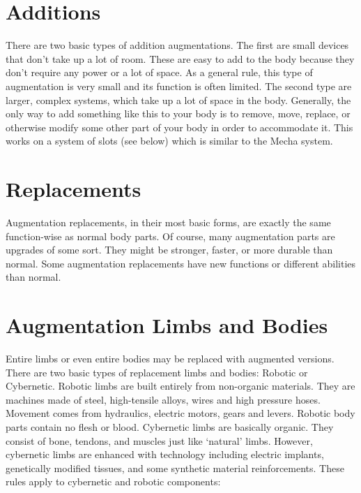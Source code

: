 \documentclass[twoside]{book}
\begin{document}
\section{Additions}
     There are two basic types of addition augmentations.
             The first are small devices that don't take up a lot
             of room. These are easy to add to the body because they
             don't require any power or a lot of space. As a
             general rule, this type of augmentation is very small and
             its function is often limited.  The second type are larger, complex systems, which
             take up a lot of space in the body. Generally, the only way
             to add something like this to your body is to remove, move,
             replace, or otherwise modify some other part of your body in
             order to accommodate it. This works on a system of slots
             (see below) which is similar to the Mecha system. 
\section{Replacements}
     Augmentation replacements, in their most basic forms,
             are exactly the same function-wise as normal body parts. Of
             course, many augmentation parts are upgrades of some sort.
             They might be stronger, faster, or more durable than normal.
             Some augmentation replacements have new functions or
             different abilities than normal. 
\section{Augmentation Limbs and Bodies}
     Entire limbs or even entire bodies may be replaced
             with augmented versions. There are two basic types of
             replacement limbs and bodies: Robotic or Cybernetic.  Robotic limbs are built entirely from non-organic
             materials. They are machines made of steel, high-tensile
             alloys, wires and high pressure hoses. Movement comes from
             hydraulics, electric motors, gears and levers. Robotic body
             parts contain no flesh or blood.  Cybernetic limbs are basically organic. They consist
             of bone, tendons, and muscles just like
             `natural' limbs. However, cybernetic limbs are
             enhanced with technology including electric implants,
             genetically modified tissues, and some synthetic material
             reinforcements.  These rules apply to cybernetic and robotic
             components: 
\end{document}
